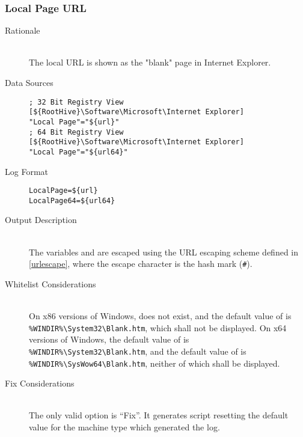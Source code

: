 \subsubsection{Local Page URL}
\begin{description}
\item[Rationale]  \hfill \\ The local URL is shown as the "blank" page in
Internet Explorer.

\item[Data Sources] \hfill
\vspace{-\baselineskip}
\begin{verbatim}
; 32 Bit Registry View
[${RootHive}\Software\Microsoft\Internet Explorer]
"Local Page"="${url}"
; 64 Bit Registry View
[${RootHive}\Software\Microsoft\Internet Explorer]
"Local Page"="${url64}"
\end{verbatim}
\item[Log Format] \hfill
\vspace{-\baselineskip}
\begin{verbatim} 
LocalPage=${url}
LocalPage64=${url64}
\end{verbatim}
\item[Output Description] \hfill \\
The variables  and  are escaped using the URL escaping
scheme defined in \ref{urlescape}, where the escape character is the hash mark
(\verb|#|).
\item[Whitelist Considerations] \hfill \\
On x86 versions of Windows,  does not exist, and the default value of
 is \verb|%WINDIR%\System32\Blank.htm|, which shall not be displayed.
On x64 versions of Windows, the default value of  is
\verb|%WINDIR%\System32\Blank.htm|, and the default value of  is
\verb|%WINDIR%\SysWow64\Blank.htm|, neither of which shall be displayed.
\item[Fix Considerations] \hfill \\
The only valid option is ``Fix''. It generates script resetting the default
value for the machine type which generated the log.
\end{description}

